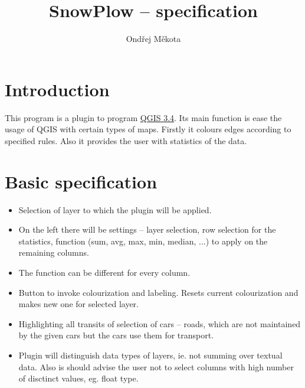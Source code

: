 \documentclass[12pt,a4paper]{article}
\begin{document}
\title{SnowPlow – specification}
\author{Ondřej Měkota}

\maketitle
\section{Introduction}

\par This program is a plugin to program \href{https://qgis.org/en/site/index.html}{QGIS 3.4}. 
Its main function is ease the usage of QGIS with certain types of maps.
Firstly it colours edges according to specified rules.
Also it provides the user with statistics of the data.


\section{Basic specification}
\begin{itemize}
    \item Selection of layer to which the plugin will be applied.
    \item On the left there will be settings – layer selection, row selection for the statistics, function (sum, avg, max, min, median,  ...) to apply on the remaining columns.
    \item The function can be different for every column.
    \item Button to invoke colourization and labeling. Resets current colourization and makes new one for selected layer.
    \item Highlighting all transits of selection of cars – roads, which are not maintained by the given cars but the cars use them for transport. 
    \item Plugin will distinguish data types of layers, ie. not summing over textual data. Also is should advise the user not to select columns with high number of disctinct values, eg. float type.
        

\end{itemize}
\end{document}
